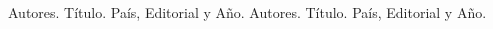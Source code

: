 \begin{thebibliography}{XXX0000}
     Autores. Título. País, Editorial y Año.
     Autores. Título. País, Editorial y Año.
\end{thebibliography}